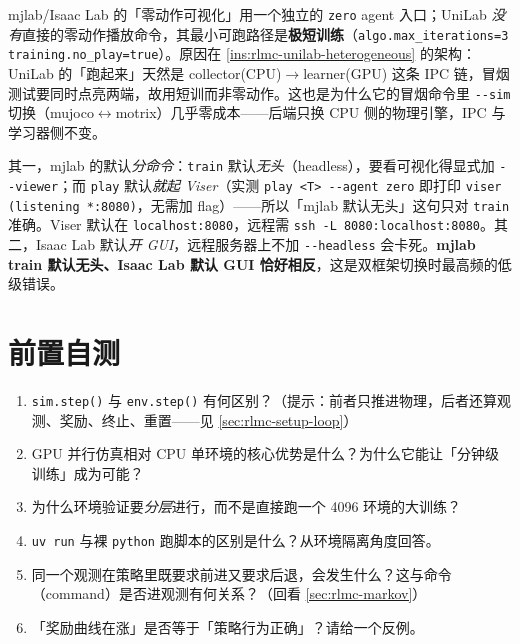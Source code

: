 \begin{note}
mjlab/Isaac Lab 的「零动作可视化」用一个独立的 \verb|zero| agent 入口；UniLab \emph{没有}直接的零动作播放命令，其最小可跑路径是\textbf{极短训练}（\verb|algo.max_iterations=3 training.no_play=true|）。原因在 \cref{ins:rlmc-unilab-heterogeneous} 的架构：UniLab 的「跑起来」天然是 collector(CPU)$\to$learner(GPU) 这条 IPC 链，冒烟测试要同时点亮两端，故用短训而非零动作。这也是为什么它的冒烟命令里 \verb|--sim| 切换（mujoco$\leftrightarrow$motrix）几乎零成本——后端只换 CPU 侧的物理引擎，IPC 与学习器侧不变。
\end{note}

\begin{note}
其一，mjlab 的默认\emph{分命令}：\verb|train| 默认\emph{无头}（headless），要看可视化得显式加 \verb|--viewer|；而 \verb|play| 默认\emph{就起 Viser}（实测 \verb|play <T> --agent zero| 即打印 \verb|viser (listening *:8080)|，无需加 flag）——所以「mjlab 默认无头」这句只对 \verb|train| 准确。Viser 默认在 \verb|localhost:8080|，远程需 \verb|ssh -L 8080:localhost:8080|。其二，Isaac Lab 默认\emph{开 GUI}，远程服务器上不加 \verb|--headless| 会卡死。\textbf{mjlab train 默认无头、Isaac Lab 默认 GUI 恰好相反}，这是双框架切换时最高频的低级错误。
\end{note}

\section{前置自测}
\label{sec:rlmc-setup-pretest}

\begin{practice}
\begin{enumerate}
  \item \verb|sim.step()| 与 \verb|env.step()| 有何区别？（提示：前者只推进物理，后者还算观测、奖励、终止、重置——见 \cref{sec:rlmc-setup-loop}）
  \item GPU 并行仿真相对 CPU 单环境的核心优势是什么？为什么它能让「分钟级训练」成为可能？
  \item 为什么环境验证要\emph{分层}进行，而不是直接跑一个 4096 环境的大训练？
  \item \verb|uv run| 与裸 \verb|python| 跑脚本的区别是什么？从环境隔离角度回答。
  \item 同一个观测在策略里既要求前进又要求后退，会发生什么？这与命令（command）是否进观测有何关系？（回看 \cref{sec:rlmc-markov}）
  \item 「奖励曲线在涨」是否等于「策略行为正确」？请给一个反例。
\end{enumerate}
\end{practice}


